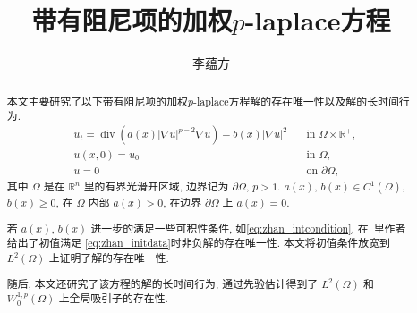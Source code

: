 \documentclass[twoside,longtitle]{LZUthesis}
\theoremstyle{definition}
\numberwithin{equation}{chapter}
\newcommand*\abs[1]{\lvert#1\rvert}
\newcommand\R{\mathbb{R}}
\DeclareMathOperator{\Div}{div}
\begin{document}
\classification{}

\confidential{}

\title{带有阻尼项的加权$p$-laplace方程}




\author{李蕴方}






\submitdate{}


\degreedate{}


\maketitle

\makestatement

\frontmatter{}

\begin{abstract}
	本文主要研究了以下带有阻尼项的加权$p$-laplace方程解的存在唯一性以及解的长时间行为.
	\begin{equation*}
		\begin{alignedat}{2}
			& u_t = \Div(a(x)\abs{\nabla u}^{p-2}\nabla u) - b(x)\abs{\nabla u}^2 \quad &\text{in } \Omega \times \R^+,\\
			& u(x,0) = u_0 \quad &\text{in } \Omega,\\
			& u = 0 \quad &\text{on } \partial\Omega,
		\end{alignedat}
	\end{equation*}
	其中 $\Omega$ 是在 $\R^{n}$ 里的有界光滑开区域, 边界记为 $\partial\Omega$, $p>1$.
	$ a(x)$, $b(x) \in C^1(\bar{\Omega}) $, $b(x) \geq 0$, 在 $\Omega$ 内部 $a(x) > 0$, 在边界 $\partial\Omega$ 上 $a(x) = 0$.

	若 $a(x)$, $b(x)$ 进一步的满足一些可积性条件, 如\cref{eq:zhan_intcondition}, 在~\citep{Zhan2019Uniquenessa}里作者给出了初值满足
	\cref{eq:zhan_initdata}时非负解的存在唯一性. 本文将初值条件放宽到 $L^2(\Omega)$ 上证明了解的存在唯一性.

	随后, 本文还研究了该方程的解的长时间行为, 通过先验估计得到了 $L^2(\Omega)$ 和 $W_0^{1,p}(\Omega)$ 上全局吸引子的存在性.
\end{abstract}
\end{document}
